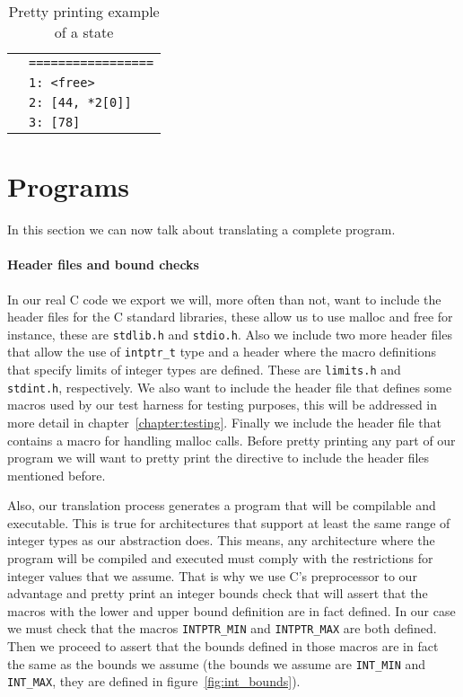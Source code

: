 \begin{table}[h!]
\begin{tabular}{|l|l|}
                                                                                                               & \verb|=================| \\
                                                                                                               & \verb|1: <free>| \\
                                                                                                               & \verb|2: [44, *2[0]]| \\
                                                                                                               & \verb|3: [78]| \\
  \hline
\end{tabular}

\caption{Pretty printing example of a state}
\label{tab:pretty_simp_state}
\end{table}


\section{Programs}

In this section we can now talk about translating a complete program.

\paragraph{Header files and bound checks}
In our real C code we export we will, more often than not, want to include the header files for the C standard libraries, these allow us to use malloc and free for instance, these are \verb|stdlib.h| and \verb|stdio.h|.
Also we include two more header files that allow the use of \verb|intptr_t| type and a header where the macro definitions that specify limits of integer types are defined.
These are \verb|limits.h| and \verb|stdint.h|, respectively.
We also want to include the header file that defines some macros used by our test harness for testing purposes, this will be addressed in more detail in chapter~\ref{chapter:testing}.
Finally we include the header file that contains a macro for handling malloc calls.
Before pretty printing any part of our program we will want to pretty print the directive to include the header files mentioned before.


Also, our translation process generates a program that will be compilable and executable.
This is true for architectures that support at least the same range of integer types as our abstraction does.
This means, any architecture where the program will be compiled and executed must comply with the restrictions for integer values that we assume.
That is why we use C's preprocessor to our advantage and pretty print an integer bounds check that will assert that the macros with the lower and upper bound definition are in fact defined.
In our case we must check that the macros \verb|INTPTR_MIN| and \verb|INTPTR_MAX| are both defined.
Then we proceed to assert that the bounds defined in those macros are in fact the same as the bounds we assume (the bounds we assume are \verb|INT_MIN| and \verb|INT_MAX|, they are defined in figure~\ref{fig:int_bounds}).


